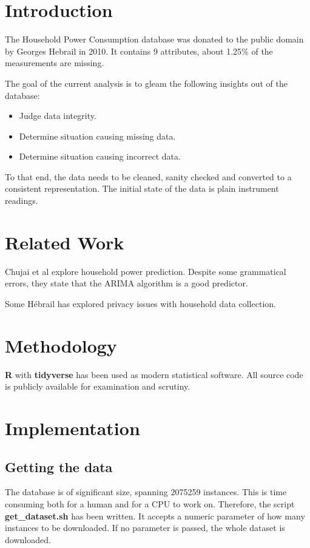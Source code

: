 \documentclass[11pt]{article}
\title{\MakeMeBlue{Data reliability for the Household Power Consumption Dataset}}
\author{Miroslav Vitkov}
\date{\today}
\newcommand{\code}[1]{\textbf{#1}}
\newcommand{\para}[0]{\par\vspace{0.5cm}}
\begin{document}
\maketitle

\section{Introduction}
The Household Power Consumption database was donated to the public domain by Georges Hebrail in 2010.
It contains 9 attributes, about 1.25\% of the measurements are missing.
\para
The goal of the current analysis is to gleam the following insights out of the database:
\begin{itemize}
    \item{Judge data integrity.}
    \item{Determine situation causing missing data.}
    \item{Determine situation causing incorrect data.}
\end{itemize}
\para
To that end, the data needs to be cleaned, sanity checked and converted to a consistent representation.
The initial state of the data is plain instrument readings.

\section{Related Work}
Chujai et al\cite{q1} explore household power prediction.
Despite some grammatical errors, they state that the ARIMA algorithm is a good predictor.
\para 
Some Hébrail has explored privacy issues with household data collection\cite{q2}.
\section{Methodology}
\code{R} with \code{tidyverse} has been used as modern statistical software.
All source code is publicly available for examination and scrutiny.

\section{Implementation}
\subsection{Getting the data}
The database is of significant size, spanning 2075259 instances.
This is time consuming both for a human and for a CPU to work on.
Therefore, the script \code{get\_dataset.sh} has been written.
It accepts a numeric parameter of how many instances to be downloaded.
If no parameter is passed, the whole dataset is downloaded.
\end{document}
